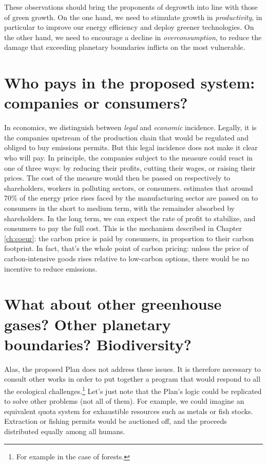 \documentclass[a5paper,english,openany]{memoir}
\begin{document}
These observations should bring the proponents of degrowth into line with those of green growth. On the one hand, we need to stimulate growth in \textit{productivity}, in particular to improve our energy efficiency and deploy greener technologies. On the other hand, we need to encourage a decline in \textit{overconsumption}, to reduce the damage that exceeding planetary boundaries inflicts on the most vulnerable. 

\section*{\normalsize Who pays in the proposed system: companies or consumers?}\label{q:incidence}

In economics, we distinguish between \textit{legal} and \textit{economic} incidence. Legally, it is the companies upstream of the production chain that would be regulated and obliged to buy emissions permits. But this legal incidence does not make it clear who will pay. In principle, the companies subject to the measure could react in one of three ways: by reducing their profits, cutting their wages, or raising their prices. The cost of the measure would then be passed on respectively to shareholders, workers in polluting sectors, or consumers. \cite{ganapati_energy_2020} estimates that around 70\% of the energy price rises faced by the manufacturing sector are passed on to consumers in the short to medium term, with the remainder absorbed by shareholders. In the long term, we can expect the rate of profit to stabilize, and consumers to pay the full cost. This is the mechanism described in Chapter \ref{ch:coeur}: the carbon price is paid by consumers, in proportion to their carbon footprint. In fact, that's the whole point of carbon pricing: unless the price of carbon-intensive goods rises relative to low-carbon options, there would be no incentive to reduce emissions.

\section*{\normalsize What about other greenhouse gases? Other planetary boundaries? Biodiversity?}\label{q:scope}

Alas, the proposed Plan does not address these issues. It is therefore necessary to consult other works in order to put together a program that would respond to all the ecological challenges.\footnote{For example \citet{strassburg_reducing_2009,karsenty_geopolitique_2021} in the case of forests.} %
Let's just note that the Plan's logic could be replicated to solve other problems (not all of them). For example, we could imagine an equivalent quota system for exhaustible resources such as metals or fish stocks. Extraction or fishing permits would be auctioned off, and the proceeds distributed equally among all humans.
\end{document}
